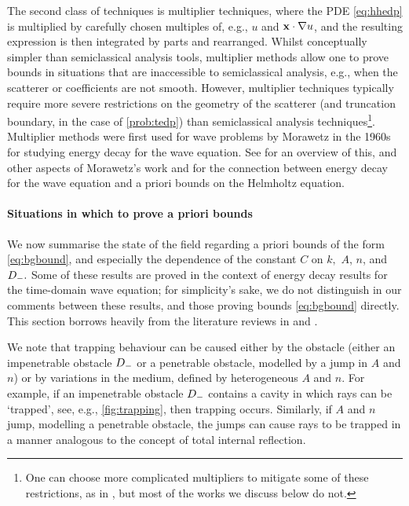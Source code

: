 The second class of techniques is multiplier techniques, where the PDE \eqref{eq:hhedp} is multiplied by carefully chosen multiples of, e.g.,  $u$ and $\mathbf{x}\cdot\nabla u$, and the resulting expression is then integrated by parts and rearranged. Whilst conceptually simpler than semiclassical analysis tools, multiplier methods allow one to prove bounds in situations that are inaccessible to semiclassical analysis, e.g., when the scatterer or coefficients are not smooth. However, multiplier techniques typically require more severe restrictions on the geometry of the scatterer (and truncation boundary, in the case of \cref{prob:tedp}) than semiclassical analysis techniques\footnote{One can choose more complicated multipliers to mitigate some of these restrictions, as in \cite{MoRaSt:77}, but most of the works we discuss below do not.}. Multiplier methods were first used for wave problems by Morawetz in the 1960s for studying  energy decay for the wave equation. See \cite{GaGrPaSaSoTa:18} for an overview of this, and other aspects of Morawetz's work and \cite[Theorem 1.1]{Vo:99} for the connection between energy decay for the wave equation and a priori bounds on the Helmholtz equation.

\paragraph{Situations in which to prove a priori bounds} We now summarise the state of the field regarding a priori bounds of the form \eqref{eq:bgbound}, and especially the dependence of the constant $C$ on $k,$ $A$, $n$, and $D_{-}.$ Some of these results are proved in the context of energy decay results for the time-domain wave equation; for simplicity's sake, we do not distinguish in our comments between these results, and those proving bounds \eqref{eq:bgbound} directly. This section borrows heavily from the literature reviews in \cite[Section 1.1]{ChSpGiSm:17} and \cite[Sections 1 and 2.4]{GrPeSp:19}.

We note that trapping behaviour can be caused either by the obstacle (either an impenetrable obstacle $D_{-}$ or a penetrable obstacle, modelled by a jump in $A$ and $n$) or by variations in the medium, defined by heterogeneous $A$ and $n$. For example, if an impenetrable obstacle $D_{-}$ contains a cavity in which rays can be `trapped', see, e.g., \cref{fig:trapping}, then trapping occurs. Similarly, if $A$ and $n$ jump, modelling a penetrable obstacle, the jumps can cause rays to be trapped in a manner analogous to the concept of total internal reflection.

